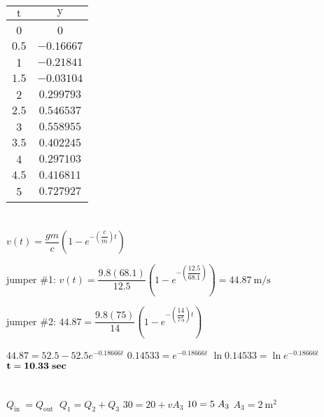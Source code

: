 \documentclass[../main.tex]{subfiles}
\begin{document}
\begin{enumerate}[label=\bfseries(\alph*)]
\begin{tabular}{|c|c|}
\hline
$\mathrm{t}$ & $\mathrm{y}$ \\
\hline
0 & 0 \\
\hline
$0.5$ & $-0.16667$ \\
\hline
1 & $-0.21841$ \\
\hline
$1.5$ & $-0.03104$ \\
\hline
2 & $0.299793$ \\
\hline
$2.5$ & $0.546537$ \\
\hline
3 & $0.558955$ \\
\hline
$3.5$ & $0.402245$ \\
\hline
4 & $0.297103$ \\
\hline
$4.5$ & $0.416811$ \\
\hline
5 & $0.727927$ \\
\hline
\end{tabular}
\bigbreak

\begin{figure}[H]
		\label{fig:fig_1_4}
	\end{figure}
	\bigbreak

\section{ }
$v(t)=\dfrac{g m}{c}\left(1-e^{-\left(\dfrac{c}{m}\right) t}\right)$

jumper \#1: $v(t)=\dfrac{9.8(68.1)}{12.5}\left(1-e^{-\left(\dfrac{12.5}{68.1}\right)}\right)=44.87 \mathrm{~m} / \mathrm{s}$

jumper \#2: $44.87=\dfrac{9.8(75)}{14}\left(1-e^{-\left(\dfrac{14}{75}\right) t}\right)$

$44.87=52.5-52.5 e^{-0.18666 t}$
\bigbreak
$0.14533=e^{-0.18666 t}$\newline
$\ln 0.14533=\ln e^{-0.18666 t}$
\bigbreak
$\bold{ t=10.33 \mathrm\bold\hspace*{0.1cm}{sec}}$
\bigbreak

\section{ }
$ Q_{\text {in }}=Q_{\text {out }}$
\bigbreak
$Q_{1}=Q_{2}+Q_{3}$
\bigbreak
$30=20+v A_{3}$
\bigbreak
$10=5\hspace*{0.1cm} A_{3}$
\bigbreak
$A_{3}=2 \mathrm{~m}^{2}$
\bigbreak

\section{ }


\end{enumerate}
\end{document}
